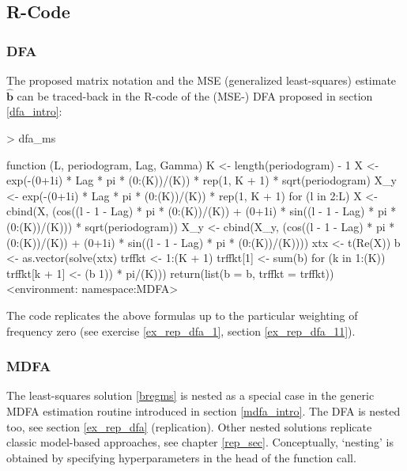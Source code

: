 \documentclass[a4paper]{book}
\begin{document}
\subsection{R-Code}

\subsubsection{DFA}

The proposed matrix notation and the MSE (generalized least-squares) estimate $\hat{\mathbf{b}}$ can be traced-back in the R-code of the (MSE-) DFA proposed in section \ref{dfa_intro}:

\begin{Schunk}
\begin{Sinput}
> dfa_ms
\end{Sinput}
\begin{Soutput}
function (L, periodogram, Lag, Gamma) 
{
    K <- length(periodogram) - 1
    X <- exp(-(0+1i) * Lag * pi * (0:(K))/(K)) * rep(1, K + 1) * 
        sqrt(periodogram)
    X_y <- exp(-(0+1i) * Lag * pi * (0:(K))/(K)) * rep(1, K + 
        1)
    for (l in 2:L) {
        X <- cbind(X, (cos((l - 1 - Lag) * pi * (0:(K))/(K)) + 
            (0+1i) * sin((l - 1 - Lag) * pi * (0:(K))/(K))) * 
            sqrt(periodogram))
        X_y <- cbind(X_y, (cos((l - 1 - Lag) * pi * (0:(K))/(K)) + 
            (0+1i) * sin((l - 1 - Lag) * pi * (0:(K))/(K))))
    }
    xtx <- t(Re(X)) %
    b <- as.vector(solve(xtx) %
    trffkt <- 1:(K + 1)
    trffkt[1] <- sum(b)
    for (k in 1:(K)) {
        trffkt[k + 1] <- (b %
            1)) * pi/(K)))
    }
    return(list(b = b, trffkt = trffkt))
}
<environment: namespace:MDFA>
\end{Soutput}
\end{Schunk}
The code replicates the above formulas up to the particular weighting of frequency zero (see exercise \ref{ex_rep_dfa_1}, section \ref{ex_rep_dfa_11}).

\subsubsection{MDFA}

The least-squares solution \ref{bregms} is nested as a special case in the generic MDFA estimation routine introduced in section \ref{mdfa_intro}. The DFA is nested too, see section  \ref{ex_rep_dfa} (replication). Other nested solutions replicate classic model-based approaches, see chapter \ref{rep_sec}. Conceptually, `nesting' is obtained by specifying hyperparameters in the head of the function call.
\end{document}
